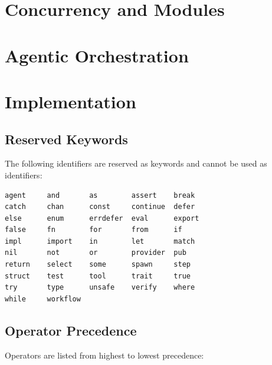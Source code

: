 \documentclass[11pt,a4paper]{book}
\begin{document}
\part{Concurrency and Modules}





\part{Agentic Orchestration}






\part{Implementation}




\appendix




\chapter{Reserved Keywords}
\label{app:keywords}

The following identifiers are reserved as keywords and cannot be used as identifiers:

\begin{lstlisting}[numbers=none]
agent     and       as        assert    break
catch     chan      const     continue  defer
else      enum      errdefer  eval      export
false     fn        for       from      if
impl      import    in        let       match
nil       not       or        provider  pub
return    select    some      spawn     step
struct    test      tool      trait     true
try       type      unsafe    verify    where
while     workflow
\end{lstlisting}

\chapter{Operator Precedence}
\label{app:precedence}

Operators are listed from highest to lowest precedence:
\end{document}
